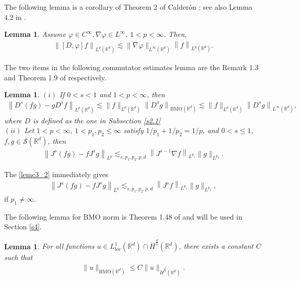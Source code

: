 \documentclass[10pt,twoside,a4paper]{article}
\newtheorem{lem}[thm]{Lemma}
\numberwithin{equation}{section}\allowdisplaybreaks
\def\leq{\leqslant}
\begin{document}
The following lemma is a corollary of Theorem 2 of Calder{\'o}n \cite{calderon1965commutators}; see also Lemma 4.2 in \cite{chen2023well}.
\begin{lem} \label{lemc2}
	Assume $\varphi \in C^{\infty}, \nabla \varphi \in L^{\infty}$, $1<p<\infty$. Then,
	\begin{align}
		\left\|[D, \varphi] f\right\|_{L^{p}( \mathbb{R}^d)  } \lesssim\|\nabla \varphi\|_{L^{\infty}( \mathbb{R}^d)} \left\|f\right\|_{L^{p}( \mathbb{R}^d)  }. \label{lemc2_1}
	\end{align}	
\end{lem}

The two items in the following commutator estimates lemma are the  Remark 1.3 and Theorem 1.9 of \cite{li2019kato}  respectively.
\begin{lem}  \label{lemc3}
$ (i) $	If $0< s<1 $ and $ 1<p<\infty $, then
	\begin{align}  \label{lemc3_1}
		\left\|D^s(f g)-g D^s f\right\|_{L^p(\mathbb{R}^d)} \lesssim\|f\|_{L^p(\mathbb{R}^d)}\left\|D^s g\right\|_{\mathrm{BMO}(\mathbb{R}^d)} \lesssim\|f\|_{L^p(\mathbb{R}^d)}\left\|D^s g\right\|_{L^\infty(\mathbb{R}^d)},
	\end{align}
where $ D $ is defined as the one in Subsection \ref{s2.1}\\
$ (ii) $ Let $1<p<\infty$,  $1<p_1, p_2  \leq \infty$ satisfy $1 / p_1+1 / p_2   =1 / p$,  and $0<s \leq 1$,  $f, g \in \mathcal{S}\left(\mathbb{R}^d\right)$,  then
\begin{align}  \label{lemc3_2}
	\left\|J^s(f g)-f J^s g\right\|_{L^p} \lesssim_{s, p_1, p_2, p, d}\left\|J^{s-1} \nabla f\right\|_{L^{p_1}}\|g\|_{L^{p_2}} .
\end{align}

\end{lem}
The \eqref{lemc3_2} immediately gives 
\begin{align}  \label{lemc3_3}
	\left\|J^s(f g)-f J^s g\right\|_{L^p} \lesssim_{s, p_1, p_2, p, d}\left\|J^{s}  f\right\|_{L^{p_1}}\|g\|_{L^{p_2}},
\end{align}
if $ p_1 \neq \infty. $

The following lemma for  $ \mathrm{BMO} $ norm  is Theorem 1.48 of \cite{bahouri2011fourier} and will be used in Section \ref{s4}.
\begin{lem}   \label{lem4}
For all functions $u \in L_{l o c}^1\left(\mathbb{R}^d\right) \cap \dot{H}^{\frac{d}{2}}\left(\mathbb{R}^d\right)$, there exists a constant $C$ such that
\begin{align} \label{lem4_1}
		\|u\|_{\mathrm{BMO}(\mathbb{R}^d)} \leq C\|u\|_{\dot{H}^{\frac{d}{2}}(\mathbb{R}^d)}.
\end{align}
\end{lem}
\end{document}
